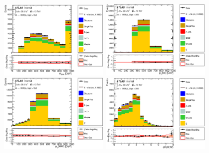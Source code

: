 \begin{figure}[!h]
\begin{center}
\includegraphics*[width=0.47\textwidth] {chapters/dihiggs2/figures/ControlPlots/36ifb_CPUpdated_opt2000_mBBcr_plots_103/C_mBBcr_opt2000ichep_bbpt350_WWMass_regionA_met25d020}
\includegraphics*[width=0.47\textwidth] {chapters/dihiggs2/figures/ControlPlots/36ifb_CPUpdated_opt2000_mBBcr_plots_103/C_mBBcr_opt2000ichep_bbpt350_bbPt_regionA_met25d020}
\includegraphics*[width=0.47\textwidth] {chapters/dihiggs2/figures/ControlPlots/36ifb_CPUpdated_opt2000_mBBcr_plots_103/C_mBBcr_opt2000ichep_bbpt350_WWPt_regionA_met25d020}
\includegraphics*[width=0.47\textwidth] {chapters/dihiggs2/figures/ControlPlots/36ifb_CPUpdated_opt2000_mBBcr_plots_103/C_mBBcr_opt2000ichep_bbpt350_drww_regionA_met25d020}

\end{center}
\end{figure}

